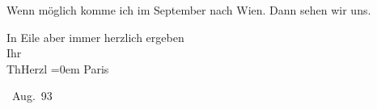 \pstart
           Wenn möglich komme ich im September nach Wien. Dann sehen wir uns.\pend
           
\pstart
           In Eile aber immer herzlich ergeben{\\[\baselineskip]} Ihr{\\[\baselineskip]}\spacefill\mbox{ThHerzl}\pend
           \leftskip=0em{}
\pstart
           \noindent{}Paris\pend
           
 Aug. 93\pend
           \endnumbering{}  \newcommand{\dateiname}{L03832}\newcommand{\titel}{Theodor Herzl an Arthur Schnitzler, 6. 8. 1893}\newcommand{\editorInnen}{Selma Jahnke und Martin Anton Müller}
